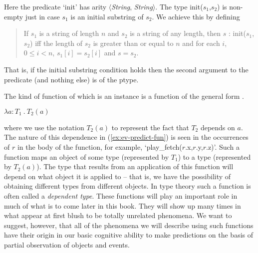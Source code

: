 
Here the predicate `init' has arity
$\langle$\textit{String}, \textit{String}$\rangle$.  The type init($s_1$,$s_2$) is
non-empty just in case $s_1$ is an initial substring of $s_2$.  We
achieve this by defining
\begin{quote}
If $s_1$ is a string of length $n$ and $s_2$ is a string of any
length, then $s$ : init($s_1$,$s_2$) iff the length of $s_2$ is
greater than or equal to $n$ and for each $i$, $0\leq i<n$,
$s_1[i]=s_2[i]$ and $s=s_2$.
\end{quote}
That is, if the initial substring condition holds then the second
argument to the predicate (and nothing else) is of the ptype.


The kind of function of which \preveg{} is an instance is a function
of the general form \nexteg{}.
\begin{ex} 
$\lambda a\!:\!T_1\ .\ T_2(a)$
\label{ex:deptypefun} 
\end{ex} 
where we use the notation $T_2(a)$ to represent the fact that $T_2$
depends on $a$. The nature of this dependence in
(\ref{ex:ev-predict-fun}) is seen in the occurrences of $r$ in the body
of the function, for example, `play\_fetch($r$.x,$r$.y,$r$.z)'.
Such a function maps an object of some type (represented by $T_1$) to
a type (represented by $T_2(a)$).  The type that results from an
application of this function will depend on what object it is applied
to -- that is, we have the possibility of obtaining different types
from different objects. In type theory such a function is often called
a \textit{dependent type}.  These functions will play an important
role in much of what is to come later in this book.  They will show up
many times in what appear at first blush to be totally unrelated
phenomena.  We want to suggest, however, that all of the phenomena we
will describe using such functions have their origin in our basic
cognitive ability to make predictions on the basis of partial
observation of objects and events.

